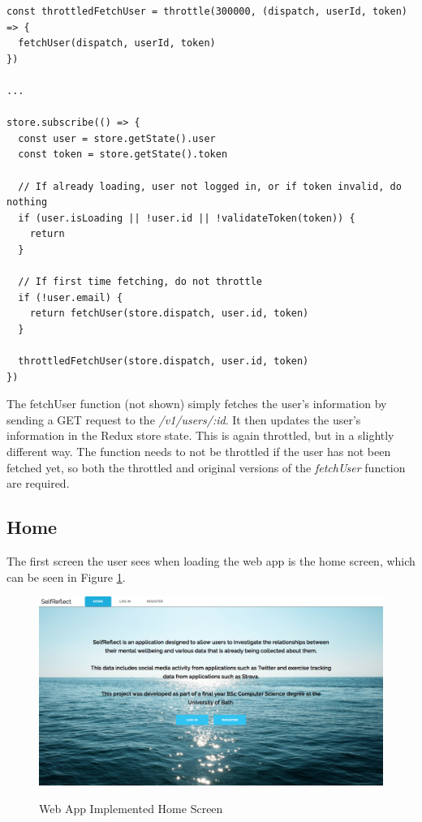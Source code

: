 \documentclass[11pt,openright,a4paper]{report}
\begin{document}
\begin{lstlisting}
const throttledFetchUser = throttle(300000, (dispatch, userId, token) => {
  fetchUser(dispatch, userId, token)
})

...

store.subscribe(() => {
  const user = store.getState().user
  const token = store.getState().token

  // If already loading, user not logged in, or if token invalid, do nothing
  if (user.isLoading || !user.id || !validateToken(token)) {
    return
  }

  // If first time fetching, do not throttle
  if (!user.email) {
    return fetchUser(store.dispatch, user.id, token)
  }

  throttledFetchUser(store.dispatch, user.id, token)
})
\end{lstlisting}

The fetchUser function (not shown) simply fetches the user's information by sending a GET request to the \emph{/v1/users/:id}. It then updates the user's information in the Redux store state. This is again throttled, but in a slightly different way. The function needs to not be throttled if the user has not been fetched yet, so both the throttled and original versions of the \emph{fetchUser} function are required.

\subsection{Home}
The first screen the user sees when loading the web app is the home screen, which can be seen in Figure \ref{fig:webhomeimpl}.

\begin{figure}[ht]
\centering
\caption{Web App Implemented Home Screen}
\includegraphics[width=\textwidth]{i/webhomeimpl.png}
\label{fig:webhomeimpl}
\end{figure}
\end{document}
